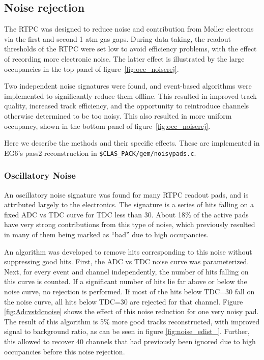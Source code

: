 \subsection{Noise rejection}
\label{sec:noise_rejection}
The RTPC was designed to reduce noise and contribution from M\o ller 
electrons via the first and second 1 atm gas gaps. During data taking, the 
readout thresholds of the RTPC were set low to avoid efficiency problems, with 
the effect of recording more electronic noise. The latter effect is illustrated 
by the large occupancies in the top panel of 
figure~\ref{fig:occ_noiserej}.  

Two independent noise signatures were found, and event-based algorithms were implemented to significantly reduce them offline. This resulted in improved track quality, increased track efficiency, and the opportunity to reintroduce channels otherwise determined to be too noisy.  This also resulted in more uniform occupancy, shown in the bottom panel of figure~\ref{fig:occ_noiserej}.  

Here we describe the methods and their specific effects. These are implemented 
in EG6's pass2 reconstruction in \texttt{\$CLAS\_PACK/gem/noisypads.c}.

\subsubsection{Oscillatory Noise}
An oscillatory noise signature was found for many RTPC readout pads, and is 
attributed largely to the electronics. The signature is a series of hits 
falling on a fixed ADC vs TDC curve for TDC less than 30.  About 18\% of the 
active pads have very strong contributions from this type of noise, which 
previously resulted in many of them being marked as ``bad'' due to high 
occupancies.

An algorithm was developed to remove hits corresponding to this noise without 
suppressing good hits.  First, the ADC vs TDC noise curve was parameterized.  
Next, for every event and channel independently, the number of hits falling on 
this curve is counted.  If a significant number of hits lie far above or below 
the noise curve, no rejection is performed.  If most of the hits below TDC=30 
fall on the noise curve, all hits below TDC=30 are rejected for that channel.  
Figure \ref{fig:Adcvstdcnoise} shows the effect of this noise reduction for one 
very noisy pad. The result of this algorithm is 5$\%$ more good tracks 
reconstructed, with improved signal to background ratio, as can be seen in 
figure \ref{fig:noise_edist_}.  Further, this allowed to recover 40 channels 
that had previously been ignored due to high occupancies before this noise 
rejection.

